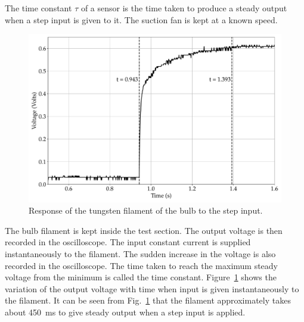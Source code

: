 The time constant $\tau$ of a sensor is the time taken to produce a steady output when a step input is given to it. The suction fan is kept at a known speed.
\begin{figure}[ht]
    \centering
    \includegraphics[width=\linewidth]{gfx/Time_constant_bulb.pdf}
    \caption{Response of the tungsten filament of the bulb to the step input.}
    \label{fig:time_filament}
\end{figure}
The bulb filament is kept inside the test section. The output voltage is then recorded in the oscilloscope. The input constant current is supplied instantaneously to the filament. The sudden increase in the voltage is also recorded in the oscilloscope. The time taken to reach the maximum steady voltage from the minimum is called the time constant. Figure~\ref{fig:time_filament} shows the variation of the output voltage with time when input is given instantaneously to the filament. It can be seen from Fig.~\ref{fig:time_filament} that the filament approximately takes about 450~ms to give steady output when a step input is applied.




